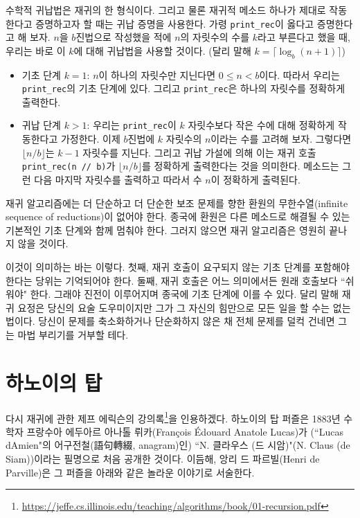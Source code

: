 \documentclass[a4paper]{oblivoir}
\begin{document}
수학적 귀납법은 재귀의 한 형식이다. 그리고 물론 재귀적 메소드 하나가 제대로 작동한다고 증명하고자 할 때는 귀납 증명을 사용한다. 가령 \texttt{print\_rec}이 옳다고 증명한다고 해 보자. $n$을 $b$진법으로 작성했을 적에 $n$의 자릿수의 수를 $k$라고 부른다고 했을 때, 우리는 바로 이 $k$에 대해 귀납법을 사용할 것이다. (달리 말해 $k=\lceil\log_b(n+1)\rceil$)

\begin{itemize}
    \item 기초 단계 $k=1$: $n$이 하나의 자릿수만 지닌다면 $0 \leq n < b$이다. 따라서 우리는 \texttt{print\_rec}의 기초 단계에 있다. 그리고 \texttt{print\_rec}은 하나의 자릿수를 정확하게 출력한다.
    \item 귀납 단계 $k>1$: 우리는 \texttt{print\_rec}이 $k$ 자릿수보다 작은 수에 대해 정확하게 작동한다고 가정한다. 이제 $b$진법에 $k$ 자릿수의 $n$이라는 수를 고려해 보자. 그렇다면 $\lfloor n/b \rfloor$는 $k-1$ 자릿수를 지닌다. 그리고 귀납 가설에 의해 이는 재귀 호출 \texttt{print\_rec(n // b)}가 $\lfloor n/b \rfloor$를 정확하게 출력한다는 것을 의미한다. 메소드는 그런 다음 마지막 자릿수를 출력하고 따라서 수 $n$이 정확하게 출력된다.
\end{itemize}

재귀 알고리즘에는 더 단순하고 더 단순한 보조 문제를 향한 환원의 무한수열(infinite sequence of reductions)이 없어야 한다. 종국에 환원은 다른 메소드로 해결될 수 있는 기본적인 기초 단계와 함께 멈춰야 한다. 그러지 않으면 재귀 알고리즘은 영원히 끝나지 않을 것이다.

이것이 의미하는 바는 이렇다. 첫째, 재귀 호출이 요구되지 않는 기초 단계를 포함해야 한다는 당위는 기억되어야 한다. 둘째, 재귀 호출은 어느 의미에서든 원래 호출보다 ``쉬워야" 한다. 그래야 진전이 이루어지며 종국에 기초 단계에 이를 수 있다. 달리 말해 재귀 요정은 당신의 요술 도우미이지만 그가 그 자신의 힘만으로 모든 일을 할 수는 없는 법이다. 당신이 문제를 축소화하거나 단순화하지 않은 채 전체 문제를 덜컥 건네면 그는 마법 부리기를 거부할 테다.

\section*{하노이의 탑}
다시 재귀에 관한 제프 에릭슨의 강의록\footnote{\url{https://jeffe.cs.illinois.edu/teaching/algorithms/book/01-recursion.pdf}}을 인용하겠다. 하노이의 탑 퍼즐은 1883년 수학자 프랑수아 에두아르 아나톨 뤼카(François Édouard Anatole Lucas)가 (``Lucas dAmien"의 어구전철(語句轉綴, anagram)인) ``N. 클라우스 (드 시암)"(N. Claus (de Siam))이라는 필명으로 처음 공개한 것이다. 이듬해, 앙리 드 파르빌(Henri de Parville)은 그 퍼즐을 아래와 같은 놀라운 이야기로 서술한다.
\end{document}
